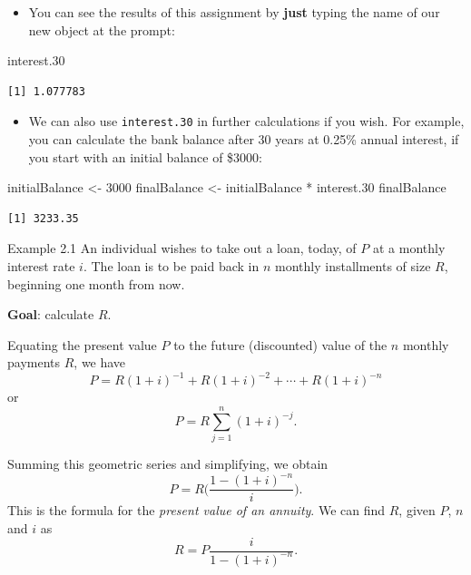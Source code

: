 \documentclass[
  9pt,
  a4paper,
  ignorenonframetext,
  notheorems]{beamer}
\newenvironment{Shaded}{\begin{snugshade}}{\end{snugshade}}
\newcommand{\DecValTok}[1]{\textcolor[rgb]{0.68,0.00,0.00}{#1}}
\newcommand{\FloatTok}[1]{\textcolor[rgb]{0.68,0.00,0.00}{#1}}
\newcommand{\NormalTok}[1]{\textcolor[rgb]{0.00,0.23,0.31}{#1}}
\newcommand{\OtherTok}[1]{\textcolor[rgb]{0.00,0.23,0.31}{#1}}
\newcommand{\SpecialCharTok}[1]{\textcolor[rgb]{0.37,0.37,0.37}{#1}}
\providecommand{\tightlist}{%
  \setlength{\itemsep}{0pt}\setlength{\parskip}{0pt}}\usepackage{longtable,booktabs,array}
\begin{document}
\begin{frame}[fragile]
\begin{itemize}
\tightlist
\item
  You can see the results of this assignment by \textbf{just} typing the
  name of our new object at the prompt:
\end{itemize}

\begin{Shaded}
\begin{Highlighting}[]
\NormalTok{interest}\FloatTok{.30}
\end{Highlighting}
\end{Shaded}

\begin{verbatim}
[1] 1.077783
\end{verbatim}

\begin{itemize}
\tightlist
\item
  We can also use \texttt{interest.30} in further calculations if you
  wish. For example, you can calculate the bank balance after 30 years
  at 0.25\% annual interest, if you start with an initial balance of
  \$3000:
\end{itemize}

\begin{Shaded}
\begin{Highlighting}[]
\NormalTok{initialBalance }\OtherTok{\textless{}{-}} \DecValTok{3000}
\NormalTok{finalBalance }\OtherTok{\textless{}{-}}\NormalTok{ initialBalance }\SpecialCharTok{*}\NormalTok{ interest}\FloatTok{.30}
\NormalTok{finalBalance}
\end{Highlighting}
\end{Shaded}

\begin{verbatim}
[1] 3233.35
\end{verbatim}
\end{frame}

\begin{frame}
\begin{block}{Example 2.1}
\protect\hypertarget{example-2.1}{}
An individual wishes to take out a loan, today, of \(P\) at a monthly
interest rate \(i\). The loan is to be paid back in \(n\) monthly
installments of size \(R\), beginning one month from now.

\textbf{Goal}: calculate \(R\).

Equating the present value \(P\) to the future (discounted) value of the
\(n\) monthly payments \(R\), we have \[
P = R(1+i)^{-1} + R(1+i)^{-2} + \cdots + R(1+i)^{-n}
\] or \[
P = R\sum_{j=1}^n (1+i)^{-j}.
\]

Summing this geometric series and simplifying, we obtain \[
P=R\Big( \frac{1 - (1+i)^{-n}}{i} \Big).
\] This is the formula for the \emph{present value of an annuity}. We
can find \(R\), given \(P\), \(n\) and \(i\) as \[
R= P \frac{i}{1-(1+i)^{-n}}.
\]
\end{block}
\end{frame}
\end{document}
